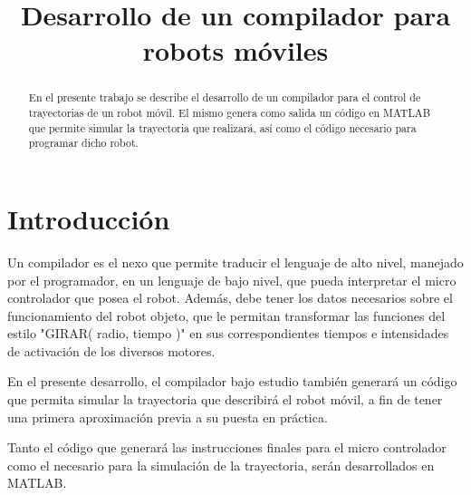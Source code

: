 \documentclass[12pt,a4paper]{article}
\title{Desarrollo de un compilador para robots móviles}
\author{}
\date{}
\begin{document}
\maketitle


	\begin{abstract}
    En el presente trabajo se describe el desarrollo de un compilador para el control de trayectorias de un robot móvil.
    El mismo genera como salida un código en MATLAB que permite simular la trayectoria que realizará, así como el código necesario para programar dicho robot.
	\end{abstract}
    
    
    \section{Introducción}
    Un compilador es el nexo que permite traducir el lenguaje de alto nivel, manejado por el programador, en un lenguaje de bajo nivel, que pueda interpretar el micro controlador que posea el robot.
    Además, debe tener los datos necesarios sobre el funcionamiento del robot objeto, que le permitan transformar las funciones del estilo "GIRAR( radio, tiempo )" en sus correspondientes tiempos e intensidades de activación de los diversos motores.
    
    En el presente desarrollo, el compilador bajo estudio también generará un código que permita simular la trayectoria que describirá el robot móvil, a fin de tener una primera aproximación previa a su puesta en práctica.
    
    Tanto el código que generará las instrucciones finales para el micro controlador como el necesario para la simulación de la trayectoria, serán desarrollados en MATLAB.
    
    
\end{document}
